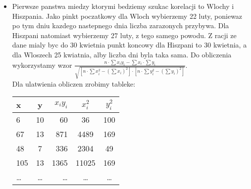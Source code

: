 \documentclass[12pt]{article}
\begin{document}
\begin{itemize}
\item
Pierwsze panstwa miedzy ktorymi bedziemy szukac korelacji to Wlochy i Hiszpania. Jako pinkt poczatkowy dla Wloch wybierzemy 22 luty, poniewaz po tym dniu kazdego nastepnego dnia liczba zarazonych przybywa. Dla Hiszpani natomiast wybierzemy 27 luty, z tego samego powodu. Z racji ze dane mialy byc do 30 kwietnia punkt koncowy dla Hiszpani to 30 kwietnia, a dla Wloszech 25 kwiatnia, alby liczba dni byla taka sama. 
Do obliczenia wykorzystamy wzor $ \frac{n\cdot \sum x_{i}y_{i} - \sum x_{i} \cdot \sum y_{i}}{\sqrt{[n \cdot \sum x^{2}_{i} - (\sum x_{i})^{2}]\cdot[n \cdot \sum y^{2}_{i} - (\sum y_{i})^{2}]}}$.\\
Dla ulatwienia obliczen zrobimy tableke:\\
\begin{tabular}{|l|c|r|c|c|} \hline
x & y & $x_{i}y_{i}$ & $x_{i}^{2}$ & $y_{i}^{2}$  \\
\hline 
6  & 10 & 60 & 36 & 100\\
\hline 
67 & 13 & 871 & 4489 &169\\
\hline
48 & 7 & 336 & 2304 & 49\\
\hline
105 & 13 & 1365 & 11025 & 169\\
\hline
\ldots & \ldots & \ldots & \ldots & \ldots\\
\hline
\end{tabular}\\


\end{itemize}
\end{document}
